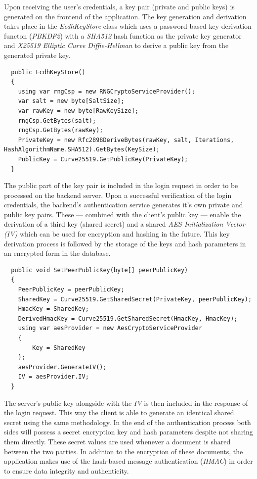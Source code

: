 Upon receiving the user's credentials, a key pair (private and public keys) is generated on the frontend of the application.
The key generation and derivation takes place in the \emph{EcdhKeyStore} class which uses a password-based key derivation functon (\emph{PBKDF2}) with a \emph{SHA512} hash function
as the private key generator and \emph{X25519 Elliptic Curve Diffie-Hellman} to derive a public key from the generated private key.

\begin{lstlisting}
  public EcdhKeyStore()
  {
	using var rngCsp = new RNGCryptoServiceProvider();
	var salt = new byte[SaltSize];
	var rawKey = new byte[RawKeySize];
	rngCsp.GetBytes(salt);
	rngCsp.GetBytes(rawKey);
	PrivateKey = new Rfc2898DeriveBytes(rawKey, salt, Iterations, HashAlgorithmName.SHA512).GetBytes(KeySize);
	PublicKey = Curve25519.GetPublicKey(PrivateKey);  
  }
\end{lstlisting}

The public part of the key pair is included in the login request in order to be processed on the backend server.
Upon a successful verification of the login credentials, the backend's authentication service generates it's own private and public key pairs.
These --- combined with the client's public key --- enable the derivation of a third key (shared secret) and a shared \emph{AES Initialization Vector (IV)} which can be used for encryption and hashing in the future.
This key derivation process is followed by the storage of the keys and hash parameters in an encrypted form in the database.

\begin{lstlisting}
  public void SetPeerPublicKey(byte[] peerPublicKey)
  {
	PeerPublicKey = peerPublicKey;
	SharedKey = Curve25519.GetSharedSecret(PrivateKey, peerPublicKey);
	HmacKey = SharedKey;
	DerivedHmacKey = Curve25519.GetSharedSecret(HmacKey, HmacKey);
	using var aesProvider = new AesCryptoServiceProvider
	{
		Key = SharedKey
	};
	aesProvider.GenerateIV();
	IV = aesProvider.IV;
  }
\end{lstlisting}

The server's public key alongside with the \emph{IV} is then included in the response of the login request.
This way the client is able to generate an identical shared secret using the same methodology.
In the end of the authentication process both sides will possess a secret encryption key and hash parameters despite not sharing them directly.
These secret values are used whenever a document is shared between the two parties.
In addition to the encryption of these documents, the application makes use of the hash-based message authentication (\emph{HMAC}) in order to 
ensure data integrity and authenticity.

